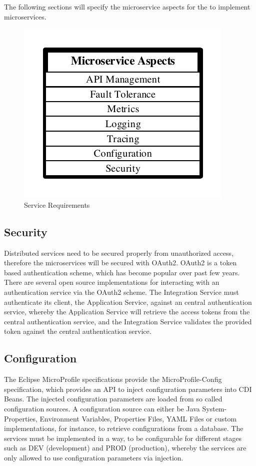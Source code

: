 The following sections will specify the microservice aspects for the to implement microservices. 

\begin{figure}[htbp]
	\centering
	\includegraphics[scale=1]{images/esboc-requirement-services.pdf}
	\caption{Service Requirements}
	\label{fig:esboc-aspects}
\end{figure} 

\subsection{Security}
\label{sec:esboc-aspects-security}
Distributed services need to be secured properly from unauthorized access, therefore the microservices will be secured with OAuth2. OAuth2 is a token based authentication scheme, which has become popular over past few years. There are several open source implementations for interacting with an authentication service via the OAuth2 scheme. The Integration Service must authenticate its client, the Application Service, against an central authentication service, whereby the Application Service will retrieve the access tokens from the central authentication service, and the Integration Service validates the provided token against the central authentication service\cite{OAuth2018}.

\subsection{Configuration}
\label{sec:esboc-aspects-config}
The Eclipse MicroProfile specifications provide the MicroProfile-Config specification, which provides an API to inject configuration parameters into CDI Beans. The injected configuration parameters are loaded from so called configuration sources. A configuration source can either be Java System-Properties, Environment Variables, Properties Files, YAML Files or custom implementations, for instance, to retrieve configurations from a database. The services must be implemented in a way, to be configurable for different stages such as DEV (development) and PROD (production), whereby  the services are only allowed to use configuration parameters via injection\cite{EclipseMicroprofileConfig2018}.

